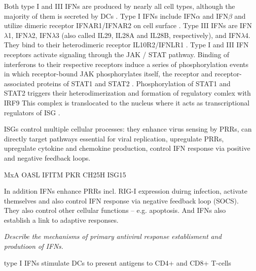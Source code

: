 		Both type I and III \gls{IFN}s are produced by nearly all cell types, although the majority of them is secreted by \gls{DC}s \parencite{Siegal1999, Odendall2014}. Type I \gls{IFN}s include \gls{IFN}$\alpha$ and \gls{IFN}$\beta$ and utilize dimeric receptor IFNAR1/IFNAR2 on cell surface \parencite{Mogensen1999}. Type III \gls{IFN}s are \gls{IFN}$\lambda$1, \gls{IFN}$\lambda$2, \gls{IFN}$\lambda$3 (also called \gls{IL}29, \gls{IL}28A and \gls{IL}28B, respectively), and \gls{IFN}$\lambda$4. They bind to their heterodimeric receptor IL10R2/IFNLR1 \parencite{Kotenko2003, Sheppard2003}. Type I and III \gls{IFN} receptors activate signaling through the \gls{JAK} / \gls{STAT} pathway. Binding of interferons to their respective receptors induce a series of phosphorylation events in which receptor-bound \gls{JAK} phosphorylates itself, the receptor and receptor-associated proteins of \gls{STAT}1 and \gls{STAT}2 \parencite{VanBoxel-Dezaire2006}. Phosphorylation of \gls{STAT}1 and \gls{STAT}2 triggers their heterodimerization and formation of regulatory comlex with \gls{IRF}9 \parencite{Fu1990} This complex is translocated to the nucleus where it acts as transcriptional regulators of \gls{ISG} \parencite{Levy1988}.
		
		\gls{ISG}s control multiple cellular processes: they enhance virus sensing by \gls{PRR}s, can directly target pathways essential for viral replication, upregulate \gls{PRR}s, upregulate cytokine and chemokine production, control \gls{IFN} response via positive and negative feedback loops.    
		 
		MxA
		OASL
		IFITM
		PKR
		CH25H
		ISG15
		
		In addition IFNs enhance PRRs incl. RIG-I expression duirng infection, activate themselves and also control IFN response via negative feedback loop (SOCS). They also control other cellular functions -- e.g. apoptosis. And IFNs also establish a link to adaptive responses.
		
		
		
		
		\textit{Describe the mechanisms of primary antiviral response establisment and produtioon of IFNs.}
		
		type I IFNs stimulate DCs to present antigens to CD4+ and CD8+ T-cells
		
		
